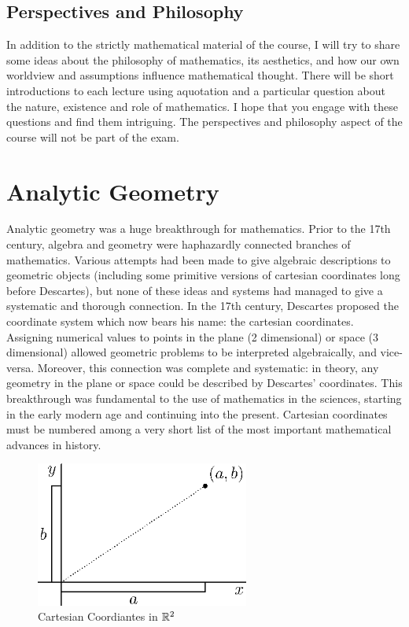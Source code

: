 \documentclass[fleqn]{report}
\begin{document}
\section*{Perspectives and Philosophy}

In addition to the strictly mathematical material of the
course, I will try to share some ideas about the philosophy of
mathematics, its aesthetics, and how our own worldview and
assumptions influence mathematical thought.
There will be short introductions to each lecture 
using aquotation and a particular question about the
nature, existence and role of mathematics. I hope that
you engage with these questions and find them intriguing. The
perspectives and philosophy aspect of the course will not be
part of the exam.

\chapter{Analytic Geometry}
\label{Analytic Geometry}

Analytic geometry was a huge breakthrough for
mathematics. Prior to the 17th century, algebra and geometry
were haphazardly connected branches of mathematics. Various
attempts had been made to give algebraic descriptions to
geometric objects (including some primitive versions of
cartesian coordinates long before Descartes), but none of
these ideas and systems had managed to give a systematic and
thorough connection. In the 17th century,
Descartes proposed the coordinate system which now bears his name:
the cartesian coordinates. Assigning numerical values to
points in the plane (2 dimensional) or space (3 dimensional)
allowed geometric problems to be interpreted algebraically, and
vice-versa. Moreover, this connection was complete and
systematic: in theory, any geometry in the plane or space
could be described by Descartes' coordinates. This
breakthrough was fundamental to the use of mathematics in
the sciences, starting in the early modern age and continuing
into the present. Cartesian coordinates must be numbered
among a very short list of the most important mathematical
advances in history.

\begin{figure}[b]
\centering
\includegraphics[width=7cm]{figure01.eps}
\caption{Cartesian Coordiantes in $\mathbb{R}^2$}
\label{Cartesian Coordiantes}
\end{figure}
\clearpage
\end{document}
